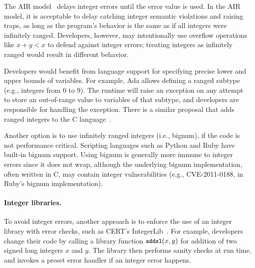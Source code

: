 The AIR model~\cite{air} delays integer errors until the error value
is used.  In the AIR model, it is acceptable to delay
catching integer semantic violations and raising traps, as long as the program's
behavior is the same as if all integers were infinitely ranged.
Developers, however, may intentionally use overflow operations like
$x + y < x$ to defend against integer errors; treating integers as
infinitely ranged would result in different behavior.

Developers would benefit from language support for specifying precise
lower and upper bounds of variables.  For example, Ada allows
defining a ranged subtype (e.g., integers from 0 to 9).  The runtime
will raise an exception on any attempt to store an out-of-range
value to variables of that subtype, and developers are responsible
for handling the exception.  There is a similar proposal that adds
ranged integers to the C language~\cite{ranged-c}.

Another option is to use infinitely ranged integers (i.e., bignum),
if the code is not performance critical.  Scripting languages such
as Python and Ruby have built-in bignum support.  Using bignum is
generally more immune to integer errors since it does not wrap,
although the underlying bignum implementation, often written in C,
may contain integer vulnerabilities (e.g., CVE-2011-0188,
in Ruby's bignum implementation).
%


\paragraph{Integer libraries.}
To avoid integer errors, another approach is to enforce the use of
an integer library with error checks, such as CERT's
IntegerLib~\cite[INT03-C]{seacord:secure-c}.  For example, developers
change their code by calling a library function $\cc{addsl}(x, y)$
for addition of two signed long integers $x$ and $y$.  The library
then performs sanity checks at run time, and invokes a preset error
handler if an integer error happens.

